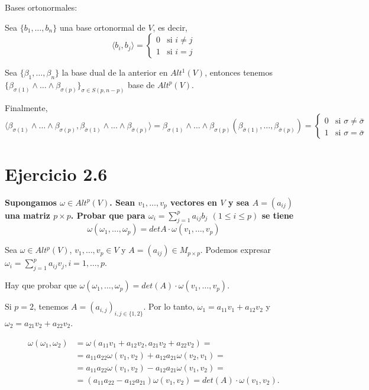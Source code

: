 \documentclass{article}
\newenvironment{itemize*}%
  {\vspace*{-0mm}
   \begin{itemize}%
    \setlength{\itemsep}{0pt}%
    \setlength{\parskip}{0pt}}%
  {\vspace*{-0mm}
   \end{itemize}}
\begin{document}
\begin{itemize*}
\item Bases ortonormales:

  Sea $\{ b_1,\dots, b_n\}$ una base ortonormal de $V$, es decir,
  $$ \langle b_i,b_j \rangle =
  \begin{cases} 
    0 & \mbox{si } i\neq j   \\
    1 & \mbox{si } i=j
  \end{cases}
  $$

  Sea $\{\beta_1,\dots,\beta_n\}$ la base dual de la anterior en $Alt^1(V)$, entonces tenemos $\{\beta_{\sigma(1)}\wedge \dots \wedge \beta_{\sigma(p)}\}_{\sigma\in S(p,n-p)}$ base de $Alt^p(V)$.

  Finalmente,
 $$ \langle \beta_{\sigma(1)}\wedge \dots \wedge \beta_{\sigma(p)},\beta_{\bar{\sigma}(1)}\wedge \dots \wedge \beta_{\bar{\sigma}(p)}\rangle  = \beta_{\sigma(1)}\wedge \dots \wedge \beta_{\sigma(p)}(\beta_{\bar{\sigma}(1)},\dots , \beta_{\bar{\sigma}(p)})=  \begin{cases} 
    0 & \mbox{si } \sigma \neq \bar{\sigma}   \\
    1 & \mbox{si } \sigma =\bar{\sigma}
  \end{cases} $$
\end{itemize*}

\section{Ejercicio 2.6}

\textbf{Supongamos $\omega \in Alt^p(V)$. Sean $v_1,\dots,v_p$ vectores en $V$ y sea $A=(a_{ij})$ una matriz $p\times p$. Probar que para $\omega_i=\sum_{j=1}^p a_{ij}b_j $ $(1\le i \le p)$ se tiene}
$$\omega(\omega_1,\dots,\omega_p)=detA \cdot \omega(v_1,\dots,v_p) $$

\vspace{3mm}
Sea $\omega\in Alt^p(V) $, $v_1,\dots,v_p\in V$ y $A=(a_{ij})\in M_{p\times p} $. Podemos expresar $\omega_i=\sum_{j=1}^pa_{ij}v_j, i =1,\dots,p $. 

Hay que probar que $\omega(\omega_1,\dots,\omega_p)=det (A) \cdot \omega (v_1,\dots,v_p)$.

Si $p=2$, tenemos $A=(a_{i,j})_{i,j\in \{1,2\}}$. Por lo tanto, $\omega_1=a_{11}v_1+a_{12}v_2$ y $\omega_2=a_{21}v_2+a_{22}v_2$. 

\begin{equation}
  \begin{split}
    \omega (\omega_1,\omega_2) &= \omega(a_{11}v_1+a_{12}v_2,a_{21}v_2+a_{22}v_2) =\\
    &= a_{11}a_{22}\omega(v_1,v_2)+a_{12}a_{21}\omega(v_2,v_1) = \\
    &= a_{11}a_{22}\omega(v_1,v_2)-a_{12}a_{21}\omega(v_1,v_2) = \\
    &= (a_{11}a_{22}-a_{12}a_{21})\omega(v_1,v_2) = det (A)\cdot \omega(v_1,v_2).
  \end{split}
\end{equation}
\end{document}
